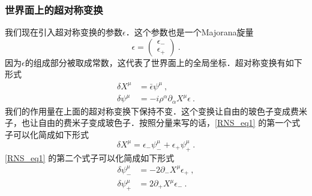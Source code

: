 \subsubsection{世界面上的超对称变换}
我们现在引入超对称变换的参数$\epsilon$．这个参数也是一个Majorana旋量
\begin{equation}
\epsilon = \begin{pmatrix}
\epsilon_- \\
\epsilon_+
\end{pmatrix}~.
\end{equation}
因为$\epsilon$的组成部分被取成常数，这代表了世界面上的全局坐标．超对称变换有如下形式
\begin{equation}\label{RNS_eq1}
\begin{aligned}
\delta X^\mu & = \bar \epsilon \psi^\mu ~, \\
\delta \psi^\mu & = - i \rho^\alpha \partial_\alpha X^\mu \epsilon ~.   
\end{aligned}
\end{equation}
我们的作用量在上面的超对称变换下保持不变．这个变换让自由的玻色子变成费米子，也让自由的费米子变成玻色子．按照分量来写的话，\autoref{RNS_eq1} 的第一个式子可以化简成如下形式
\begin{equation}
\delta X^\mu = \epsilon_- \psi_-^\mu + \epsilon_+ \psi_+^\mu~.
\end{equation}
\autoref{RNS_eq1} 的第二个式子可以化简成如下形式
\begin{equation}
\begin{aligned}
\delta \psi_-^\mu & = -2\partial_-X^\mu \epsilon_+ ~, \\
\delta \psi_+^\mu & = 2 \partial_+ X^\mu \epsilon_-~.
\end{aligned}
\end{equation}


















